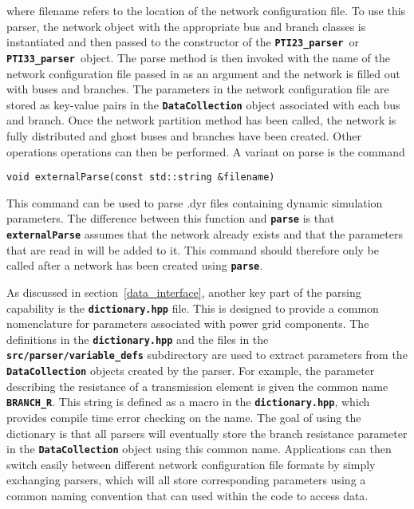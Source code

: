 where filename refers to the location of the network configuration file. To use this parser, the network object with the appropriate bus and branch classes is instantiated and then passed to the constructor of the \texttt{\textbf{PTI23\_parser }}or\texttt{\textbf{ PTI33\_parser }}object. The parse method is then invoked with the name of the network configuration file passed in as an argument and the network is filled out with buses and branches. The parameters in the network configuration file are stored as key-value pairs in the \texttt{\textbf{DataCollection}} object associated with each bus and branch. Once the network partition method has been called, the network is fully distributed and ghost buses and branches have been created. Other operations operations can then be performed. A variant on parse is the command

{
\color{red}
\begin{Verbatim}[fontseries=b]
void externalParse(const std::string &filename)
\end{Verbatim}
}

This command can be used to parse .dyr files containing dynamic simulation parameters. The difference between this function and \texttt{\textbf{parse}} is that \texttt{\textbf{externalParse}} assumes that the network already exists and that the parameters that are read in will be added to it. This command should therefore only be called after a network has been created using \texttt{\textbf{parse}}.

As discussed in section~\ref{data_interface}, another key part of the parsing
capability is the \texttt{\textbf{dictionary.hpp}} file. This is designed to provide a common nomenclature for parameters associated with power grid components.
The definitions in the \texttt{\textbf{dictionary.hpp}} and the files in the
\texttt{\textbf{src/parser/variable\_defs}} subdirectory are used to extract
parameters from the \texttt{\textbf{DataCollection}} objects created by the
parser. For example, the parameter describing the resistance of a transmission
element is given the common name \texttt{\textbf{BRANCH\_R}}. This string is
defined as a macro in the \texttt{\textbf{dictionary.hpp}}, which
provides compile time error checking on the name. The goal of using the dictionary is that all parsers will eventually store the branch resistance parameter in the \texttt{\textbf{DataCollection}} object using this common name. Applications can then switch easily between different network configuration file formats by simply exchanging parsers, which will all store corresponding parameters using a common naming convention that can used within the code to access data.
